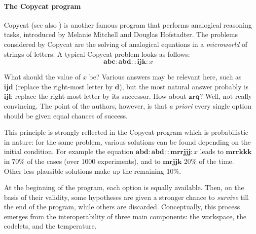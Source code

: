 \paragraph{The Copycat program\\}

Copycat \cite{Mit93} (see also \cite{HofMit94}) is another famous program that
performs analogical reasoning tasks, introduced by Melanie Mitchell and Douglas
Hofstadter. The problems considered by Copycat are the solving of analogical
equations in a \textit{microworld} of strings of letters. A typical Copycat
problem looks as follows: $$\mathbf{abc} : \mathbf{abd} :: \mathbf{ijk} : x$$

What should the value of $x$ be? Various answers may be relevant here, such as
$\mathbf{ijd}$ (replace the right-most letter by $\mathbf{d}$), but the most
natural answer probably is $\mathbf{ijl}$: replace the right-most letter by its
successor. How about $\mathbf{zrq}$? Well, not really convincing. The point of
the authors, however, is that \textit{a priori} every single option should be
given equal chances of success.

This principle is strongly reflected in the Copycat program which is
probabilistic in nature: for the same problem, various solutions can be found
depending on the initial condition. For example the  equation $\mathbf{abd} :
\mathbf{abd} :: \mathbf{mrrjjj} : x$ leads to $\mathbf{mrrkkk}$ in 70\% of the
cases (over 1000 experiments), and to $\mathbf{mrjjk}$ 20\% of the time. Other
less plausible solutions make up the remaining 10\%.

At the beginning of the program, each option is equally available.  Then, on
the basis of their validity, some hypotheses are given a stronger chance to
\textit{survive} till the end of the program, while others are discarded.
Conceptually, this process emerges from the interoperability of three main
components: the workspace, the codelets, and the temperature.

